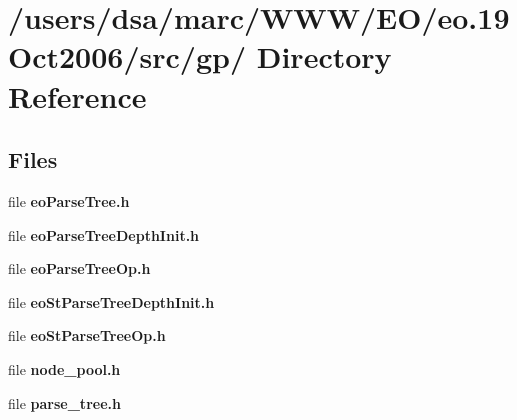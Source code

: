 \section{/users/dsa/marc/WWW/EO/eo.19Oct2006/src/gp/ Directory Reference}
\label{dir_000017}
\subsection*{Files}
\begin{CompactItemize}
\item 
file {\bf eoParseTree.h}
\item 
file {\bf eoParseTreeDepthInit.h}
\item 
file {\bf eoParseTreeOp.h}
\item 
file {\bf eoStParseTreeDepthInit.h}
\item 
file {\bf eoStParseTreeOp.h}
\item 
file {\bf node_pool.h}
\item 
file {\bf parse_tree.h}
\end{CompactItemize}
